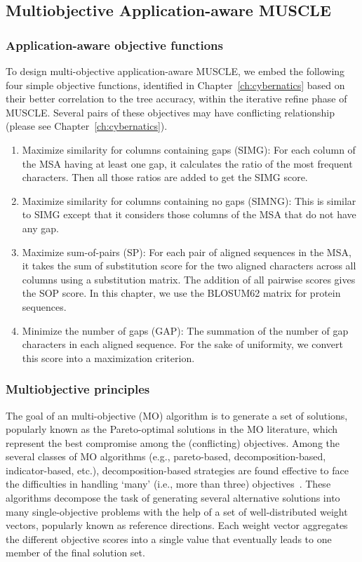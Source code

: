 

\subsection{Multiobjective Application-aware MUSCLE} \label{sec:ma-muscle}

\subsubsection{Application-aware objective functions}
To design multi-objective application-aware MUSCLE, we embed the following four simple objective functions, identified in Chapter~\ref{ch:cybernatics} based on their better correlation to the tree accuracy, within the iterative refine phase of MUSCLE. Several pairs of these objectives may have conflicting relationship (please see Chapter~\ref{ch:cybernatics}).  
\begin{enumerate}
	\item Maximize similarity for columns containing gaps (SIMG): For each column of the MSA having at least one gap, it calculates the ratio of the most frequent characters. Then all those ratios are added to get the SIMG score.
	\item Maximize similarity for columns containing no gaps (SIMNG): This is similar to SIMG except that it considers those columns of the MSA that do not have any gap.
	\item Maximize sum-of-pairs (SP): For each pair of aligned sequences in the MSA, it takes the sum of substitution score for the two aligned characters across all columns using a substitution matrix. The addition of all pairwise scores gives the SOP score. In this chapter, we use the BLOSUM62 matrix for protein sequences.
	\item Minimize the number of gaps (GAP): The summation of the number of gap characters in each aligned sequence. For the sake of uniformity, we convert this score into a maximization criterion.
\end{enumerate}


\subsubsection{Multiobjective principles}
The goal of an multi-objective (MO) algorithm is to generate a set of solutions, popularly known as the Pareto-optimal solutions in the MO literature, which represent the best compromise among the (conflicting) objectives. 
Among the several classes of MO algorithms (e.g., pareto-based, decomposition-based, indicator-based, etc.), decomposition-based strategies are found effective to face the difficulties in handling `many' (i.e., more than three) objectives~\cite{li2015many}. These algorithms decompose the task of generating several alternative solutions into many single-objective problems with the help of a set of well-distributed weight vectors, popularly known as reference directions. Each weight vector aggregates the different objective scores into a single value that eventually leads to one member of the final solution set.

